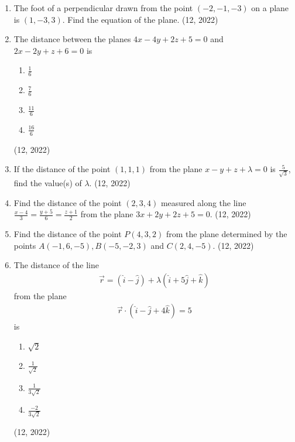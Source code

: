 \begin{enumerate}[label=\thesubsection.\arabic*, ref=\thesubsection.\theenumi]
\item The foot of a perpendicular drawn from the point $(-2,-1,-3)$ on a plane is $(1,-3,3)$. Find the equation of the plane. \hfill (12, 2022)
\item The distance between the planes $4x-4y+2z+5=0$ and $2x-2y+z+6=0$ is
	\begin{enumerate}
		\item $\frac{1}{6}$
		\item $\frac{7}{6}$
		\item $\frac{11}{6}$
		\item $\frac{16}{6}$
	\end{enumerate}
\hfill (12, 2022)
\item If the distance of the point $(1,1,1)$ from the plane $x-y+z+\lambda=0$ is $\frac{5}{\sqrt{3}}$, find the value(s) of $\lambda$. \hfill (12, 2022)

\item Find the distance of the point $(2,3,4)$ measured along the line $\frac{x-4}{3}=\frac{y+5}{6}=\frac{z+1}{2}$ from the plane $3x+2y+2z+5=0$. \hfill (12, 2022)

\item Find the distance of the point $P(4,3,2)$ from the plane determined by the points $A(-1,6,-5),B(-5,-2,3)$ and $C(2,4,-5)$. \hfill (12, 2022)

\item The distance of the line
	\begin{align}
		\vec{r}=(\hat{i}-\hat{j})+\lambda(\hat{i}+5\hat{j}+\hat{k})
	\end{align}
	from the plane
	\begin{align}
		\vec{r}\cdot(\hat{i}-\hat{j}+4\hat{k})=5
	\end{align}
	is
	\begin{enumerate}
		\item $\sqrt{2}$
		\item $\frac{1}{\sqrt{2}}$
		\item $\frac{1}{3\sqrt{2}}$
		\item $\frac{-2}{3\sqrt{2}}$
	\end{enumerate}
\hfill (12, 2022)


\end{enumerate}
